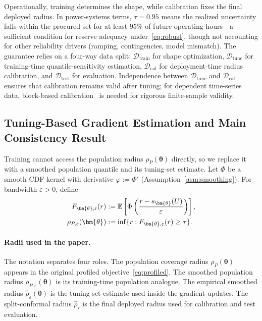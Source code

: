 \documentclass[11pt]{article}
\newcommand{\E}{\mathbb{E}}
\newcommand{\cD}{\mathcal{D}}
\newcommand{\btheta}{\bm{\theta}}
\theoremstyle{definition}
\begin{document}
Operationally, training determines the shape, while calibration fixes the final deployed radius. In power-systems terms, $\tau = 0.95$ means the realized uncertainty falls within the procured set for at least 95\% of future operating hours---a sufficient condition for reserve adequacy under~\eqref{eq:robust}, though not accounting for other reliability drivers (ramping, contingencies, model mismatch). The guarantee relies on a four-way data split: $\cD_{\text{train}}$ for shape optimization, $\cD_{\text{tune}}$ for training-time quantile-sensitivity estimation, $\cD_{\text{cal}}$ for deployment-time radius calibration, and $\cD_{\text{test}}$ for evaluation. Independence between $\cD_{\text{tune}}$ and $\cD_{\text{cal}}$ ensures that calibration remains valid after tuning; for dependent time-series data, block-based calibration~\citep{barber2023conformal} is needed for rigorous finite-sample validity.

\subsection{Tuning-Based Gradient Estimation and Main Consistency Result}

Training cannot access the population radius $\rho_P(\btheta)$ directly, so we replace it with a smoothed population quantile and its tuning-set estimate. Let $\Phi$ be a smooth CDF kernel with derivative $\varphi := \Phi'$ (Assumption~\ref{asm:smoothing}). For bandwidth $\varepsilon > 0$, define
\begin{align}\label{eq:smoothed-cdf}
F_{\btheta,\varepsilon}(r) &:= \E\left[\Phi\left(\frac{r - s_{\btheta}(U)}{\varepsilon}\right)\right], \notag\\
\rho_{P,\varepsilon}(\btheta) &:= \inf\{r : F_{\btheta,\varepsilon}(r) \geq \tau\}.
\end{align}

\paragraph{Radii used in the paper.}
The notation separates four roles. The population coverage radius $\rho_P(\btheta)$ appears in the original profiled objective~\eqref{eq:profiled}. The smoothed population radius $\rho_{P,\varepsilon}(\btheta)$ is its training-time population analogue. The empirical smoothed radius $\hat{\rho}_\varepsilon(\btheta)$ is the tuning-set estimate used inside the gradient updates. The split-conformal radius $\hat{\rho}_\tau$ is the final deployed radius used for calibration and test evaluation.
\end{document}
